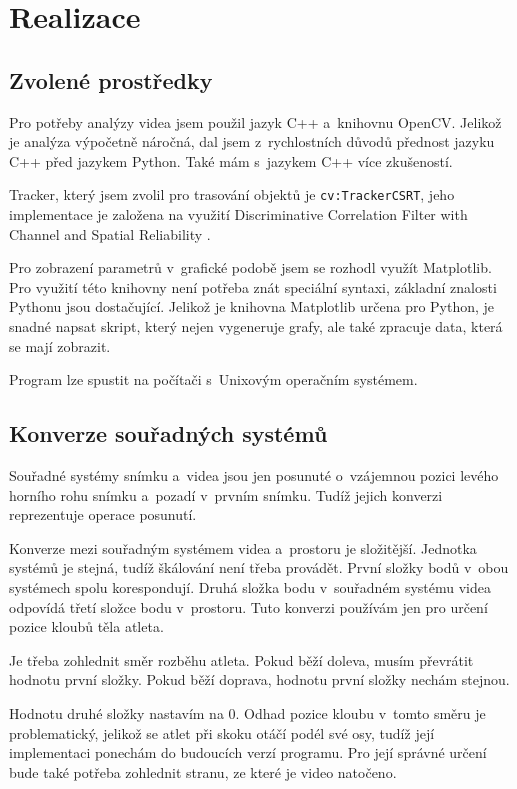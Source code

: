 \chapter{Realizace}

\section{Zvolené prostředky}
\label{sec:prostredky}

Pro potřeby analýzy videa jsem použil jazyk C++ a~knihovnu OpenCV. Jelikož je analýza výpočetně náročná, dal jsem z~rychlostních důvodů přednost jazyku C++ před jazykem Python. Také mám s~jazykem C++ více zkušeností.

Tracker, který jsem zvolil pro trasování objektů je \texttt{cv\::TrackerCSRT}, jeho implementace je založena na využití Discriminative Correlation Filter with Channel and Spatial Reliability \citep{DCFwCaSR}.

Pro zobrazení parametrů v~grafické podobě jsem se rozhodl využít Matplotlib. Pro využití této knihovny není potřeba znát speciální syntaxi, základní znalosti Pythonu jsou dostačující. Jelikož je knihovna Matplotlib určena pro Python, je snadné napsat skript, který nejen vygeneruje grafy, ale také zpracuje data, která se mají zobrazit.

Program lze spustit na počítači s~Unixovým operačním systémem.




\section{Konverze souřadných systémů}
\label{sec:konverze}

Souřadné systémy snímku a~videa jsou jen posunuté o~vzájemnou pozici levého horního rohu snímku a~pozadí v~prvním snímku. Tudíž jejich konverzi reprezentuje operace posunutí.

Konverze mezi souřadným systémem videa a~prostoru je složitější. Jednotka systémů je stejná, tudíž škálování není třeba provádět. První složky bodů v~obou systémech spolu korespondují. Druhá složka bodu v~souřadném systému videa odpovídá třetí složce bodu v~prostoru. Tuto konverzi používám jen pro určení pozice kloubů těla atleta.

Je třeba zohlednit směr rozběhu atleta. Pokud běží doleva, musím převrátit hodnotu první složky. Pokud běží doprava, hodnotu první složky nechám stejnou.

Hodnotu druhé složky nastavím na $0$. Odhad pozice kloubu v~tomto směru je problematický, jelikož se atlet při skoku otáčí podél své osy, tudíž její implementaci ponechám do budoucích verzí programu. Pro její správné určení bude také potřeba zohlednit stranu, ze které je video natočeno.

